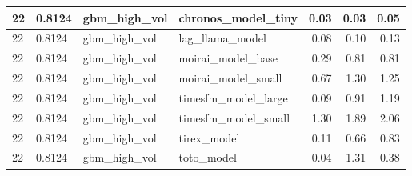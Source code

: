 {\begin{tabular}{llllrrr}
\midrule
22 & 0.8124 & gbm\_high\_vol & chronos\_model\_tiny & 0.03 & 0.03 & 0.05 \\
\midrule
22 & 0.8124 & gbm\_high\_vol & lag\_llama\_model & 0.08 & 0.10 & 0.13 \\
\midrule
22 & 0.8124 & gbm\_high\_vol & moirai\_model\_base & 0.29 & 0.81 & 0.81 \\
\midrule
22 & 0.8124 & gbm\_high\_vol & moirai\_model\_small & 0.67 & 1.30 & 1.25 \\
\midrule
22 & 0.8124 & gbm\_high\_vol & timesfm\_model\_large & 0.09 & 0.91 & 1.19 \\
\midrule
22 & 0.8124 & gbm\_high\_vol & timesfm\_model\_small & 1.30 & 1.89 & 2.06 \\
\midrule
22 & 0.8124 & gbm\_high\_vol & tirex\_model & 0.11 & 0.66 & 0.83 \\
\midrule
22 & 0.8124 & gbm\_high\_vol & toto\_model & 0.04 & 1.31 & 0.38 \\
\bottomrule
\end{tabular}
}